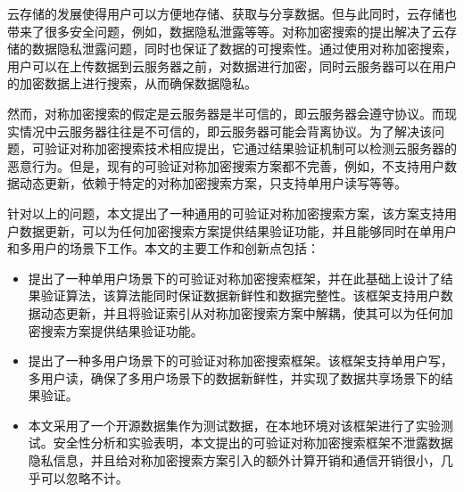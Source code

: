 \begin{cabstract}
  云存储的发展使得用户可以方便地存储、获取与分享数据。但与此同时，云存储也带来了很多安全问题，例如，数据隐私泄露等等。对称加密搜索的提出解决了云存储的数据隐私泄露问题，同时也保证了数据的可搜索性。通过使用对称加密搜索，用户可以在上传数据到云服务器之前，对数据进行加密，同时云服务器可以在用户的加密数据上进行搜索，从而确保数据隐私。

  然而，对称加密搜索的假定是云服务器是半可信的，即云服务器会遵守协议。而现实情况中云服务器往往是不可信的，即云服务器可能会背离协议。为了解决该问题，可验证对称加密搜索技术相应提出，它通过结果验证机制可以检测云服务器的恶意行为。但是，现有的可验证对称加密搜索方案都不完善，例如，不支持用户数据动态更新，依赖于特定的对称加密搜索方案，只支持单用户读写等等。

  针对以上的问题，本文提出了一种通用的可验证对称加密搜索方案，该方案支持用户数据更新，可以为任何加密搜索方案提供结果验证功能，并且能够同时在单用户和多用户的场景下工作。本文的主要工作和创新点包括：

  \begin{itemize}
    \item 提出了一种单用户场景下的可验证对称加密搜索框架，并在此基础上设计了结果验证算法，该算法能同时保证数据新鲜性和数据完整性。该框架支持用户数据动态更新，并且将验证索引从对称加密搜索方案中解耦，使其可以为任何加密搜索方案提供结果验证功能。
    \item 提出了一种多用户场景下的可验证对称加密搜索框架。该框架支持单用户写，多用户读，确保了多用户场景下的数据新鲜性，并实现了数据共享场景下的结果验证。
    \item 本文采用了一个开源数据集作为测试数据，在本地环境对该框架进行了实验测试。安全性分析和实验表明，本文提出的可验证对称加密搜索框架不泄露数据隐私信息，并且给对称加密搜索方案引入的额外计算开销和通信开销很小，几乎可以忽略不计。
  \end{itemize}

\end{cabstract}


